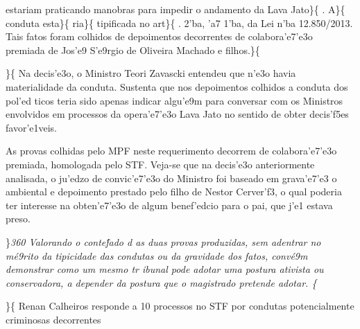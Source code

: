  estariam praticando manobras para
impedir o andamento da Lava Jato\}\{\rtlch{}  \ltrch{}
 . A\}\{\rtlch{}  \ltrch{}
 conduta esta\}\{\rtlch{} 
\ltrch{}  ria\}\{\rtlch{}  \ltrch{}
 tipificada no art\}\{\rtlch{}  \ltrch{}
 . 2'ba, 'a7 1'ba, da Lei n'ba
12.850/2013. Tais fatos foram colhidos de depoimentos decorrentes de
colabora'e7'e3o premiada de Jos'e9 S'e9rgio de Oliveira Machado e
filhos.\}\{\rtlch{}  \ltrch{} 
\par \tab \}\{\rtlch{}  \ltrch{}
 Na decis'e3o, o Ministro Teori Zavascki
entendeu que n'e3o havia materialidade da conduta. Sustenta que nos
depoimentos colhidos a conduta dos pol'ed ticos teria sido apenas
indicar algu'e9m para conversar com os Ministros envolvidos em processos
da opera'e7'e3o Lava Jato no sentido de obter decis'f5es favor'e1veis.
\par \tab As provas colhidas pelo MPF neste requerimento decorrem de
colabora'e7'e3o premiada, homologada pelo STF. Veja-se que na decis'e3o
anteriormente analisada, o ju'edzo de convic'e7'e3o do Ministro foi
baseado em grava'e7'e3 o ambiental e depoimento prestado pelo filho de
Nestor Cerver'f3, o qual poderia ter interesse na obten'e7'e3o de algum
benef'edcio para o pai, que j'e1 estava preso.
\par \}\pard \ltrpar\qj {}\sl360\widctlpar\wrapdefault\aspalpha\aspnum\faauto\adjustright{} {\rtlch{}  \ltrch{}  Valorando }{\rtlch{}  \ltrch{} 
 o conte\'fado d}{\rtlch{}  \ltrch{}  as duas provas produzidas, sem adentrar no m\'e9rito da tipicidade das condutas ou da gravidade dos fatos, conv\'e9m demonstrar como um mesmo tr
ibunal pode adotar uma postura ativista ou conservadora, a depender da postura que o magistrado }{\rtlch{}  \ltrch{}  pretende }{\rtlch{}  \ltrch{}  adotar.}{\rtlch{} 
 \ltrch{}   }\{\rtlch{} 
\ltrch{}  \par \}\{\rtlch{} 
\ltrch{}  Renan Calheiros responde a
10 processos no STF por condutas potencialmente criminosas decorrentes
